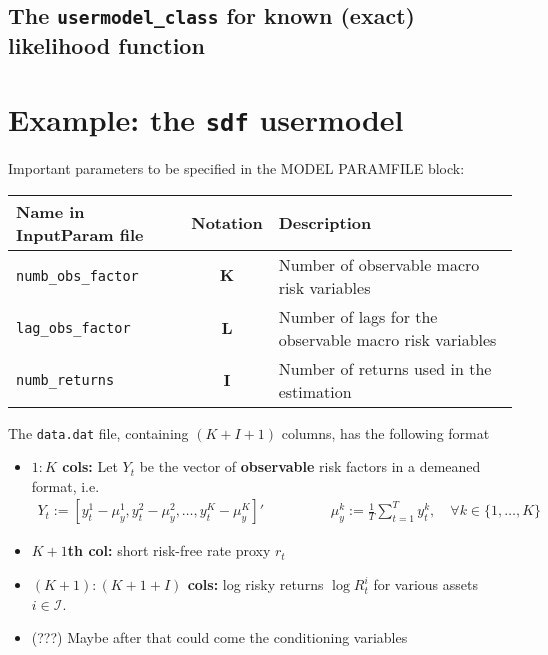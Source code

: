 \documentclass[11pt, letterpaper, notitlepage]{article}
\begin{document}
\begin{enumerate}
\begin{itemize}
\end{itemize}

\end{enumerate} 

\subsection{The \texttt{usermodel\_class} for known (exact) likelihood function}


\pagebreak


\section{Example: the \texttt{sdf} usermodel}

Important parameters to be specified in the MODEL PARAMFILE block:  
\begin{center}
\begin{tabular}{lcl}
Name in InputParam file & Notation & Description\\
\hline
\texttt{numb\_obs\_factor} &  $\mathbf{K}$ & Number of observable macro risk variables \\
\texttt{lag\_obs\_factor} &  $\mathbf{L}$ & Number of lags for the observable macro risk variables \\
\texttt{numb\_returns} & $\mathbf{I}$ & Number of returns used in the estimation
\end{tabular}
\end{center}


The \texttt{data.dat} file, containing $(K + I + 1)$ columns, has the following format
\begin{itemize}
\item \textbf{$1:K$ cols:} Let $Y_t$ be the vector of \textbf{observable} risk factors in a demeaned format, i.e.
\begin{align*}
Y_t := \left[ y_t^1 - \mu^1_y, y_t^2 - \mu^2_y, \dots, y_t^K - \mu^K_y \right]'\hspace{2cm} \mu_y^k := \frac{1}{T}\sum_{t=1}^{T} y^k_t,\quad \forall k\in\{1, \dots, K\}
\end{align*} 
\item \textbf{$K+1$th col:} short risk-free rate proxy $r_t$
\item \textbf{$(K+1):(K+1+I)$ cols:} log risky returns $\log R^i_t$ for various assets $i\in \mathcal{I}$.
\item[] (???) Maybe after that could come the conditioning variables
\end{itemize}
\end{document}
